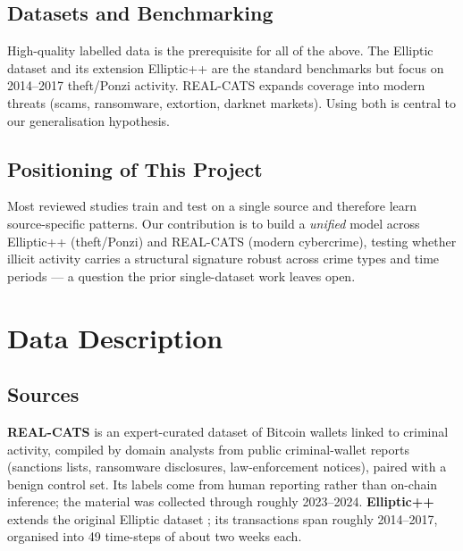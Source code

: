 \documentclass[12pt,a4paper,openany]{report}
\begin{document}
\section{Datasets and Benchmarking}
High-quality labelled data is the prerequisite for all of the above. The Elliptic dataset
\citep{weber2019elliptic} and its extension Elliptic++ \citep{ellipticpp2023} are the standard
benchmarks but focus on 2014--2017 theft/Ponzi activity. REAL-CATS \citep{realcats2024}
expands coverage into modern threats (scams, ransomware, extortion, darknet markets). Using
both is central to our generalisation hypothesis.

\section{Positioning of This Project}
Most reviewed studies train and test on a single source and therefore learn source-specific
patterns. Our contribution is to build a \emph{unified} model across Elliptic++ (theft/Ponzi) and
REAL-CATS (modern cybercrime), testing whether illicit activity carries a structural signature
robust across crime types and time periods --- a question the prior single-dataset work leaves
open.

\chapter{Data Description}\label{ch:data}

\section{Sources}
\textbf{REAL-CATS} \citep{realcats2024} is an expert-curated dataset of Bitcoin wallets linked
to criminal activity, compiled by domain analysts from public criminal-wallet reports
(sanctions lists, ransomware disclosures, law-enforcement notices), paired with a benign
control set. Its labels come from human reporting rather than on-chain inference; the material
was collected through roughly 2023--2024. \textbf{Elliptic++} \citep{ellipticpp2023} extends the
original Elliptic dataset \citep{weber2019elliptic}; its transactions span roughly 2014--2017,
organised into 49 time-steps of about two weeks each.
\end{document}
